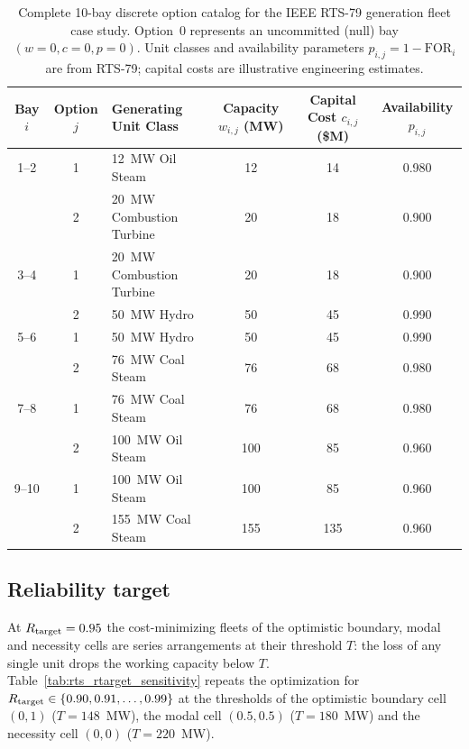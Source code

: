 \documentclass[11pt]{article}
\begin{document}
\begin{table}[!htbp]
\centering
\caption{Complete 10-bay discrete option catalog for the IEEE RTS-79 generation fleet case study. Option~0 represents an uncommitted (null) bay $(w=0, c=0, p=0)$. Unit classes and availability parameters $p_{i,j} = 1 - \text{FOR}_i$ are from RTS-79; capital costs are illustrative engineering estimates.}
\label{tab:rts_catalog}
\footnotesize
\setlength{\tabcolsep}{5pt}
\begin{tabular}{cclccc}
\hline
\textbf{Bay} $i$ & \textbf{Option} $j$ & \textbf{Generating Unit Class} & \textbf{Capacity} $w_{i,j}$ (MW) & \textbf{Capital Cost} $c_{i,j}$ (\$M) & \textbf{Availability} $p_{i,j}$\\
\hline
1--2 & 1 & 12~MW Oil Steam & 12 & 14 & 0.980\\
     & 2 & 20~MW Combustion Turbine & 20 & 18 & 0.900\\
\hline
3--4 & 1 & 20~MW Combustion Turbine & 20 & 18 & 0.900\\
     & 2 & 50~MW Hydro & 50 & 45 & 0.990\\
\hline
5--6 & 1 & 50~MW Hydro & 50 & 45 & 0.990\\
     & 2 & 76~MW Coal Steam & 76 & 68 & 0.980\\
\hline
7--8 & 1 & 76~MW Coal Steam & 76 & 68 & 0.980\\
     & 2 & 100~MW Oil Steam & 100 & 85 & 0.960\\
\hline
9--10 & 1 & 100~MW Oil Steam & 100 & 85 & 0.960\\
      & 2 & 155~MW Coal Steam & 155 & 135 & 0.960\\
\hline
\end{tabular}
\end{table}


\subsection{Reliability target} \label{sec:supp_rts_rtarget}
At $R_{\mathrm{target}} = 0.95$ the cost-minimizing fleets of the
optimistic boundary, modal and necessity cells are series arrangements at their threshold $T$: the loss of any single unit drops the
working capacity below $T$. Table~\ref{tab:rts_rtarget_sensitivity} repeats the optimization for
$R_{\mathrm{target}} \in \{0.90, 0.91, \dots, 0.99\}$ at the thresholds of the optimistic boundary cell $(0,1)$
($T=148$~MW), the modal cell $(0.5,0.5)$ ($T=180$~MW) and the necessity cell $(0,0)$ ($T=220$~MW).


\end{document}
